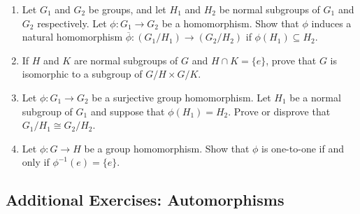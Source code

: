 {\begin{enumerate}
 
% 
%
% 

 
\item
Let $G_1$ and $G_2$ be groups, and let $H_1$ and $H_2$ be normal subgroups
of $G_1$ and $G_2$ respectively. Let $\phi : G_1 \rightarrow G_2$ be a
homomorphism. Show that $\phi$ induces a natural homomorphism
$\overline{\phi} : (G_1/H_1) \rightarrow (G_2/H_2)$ if $\phi(H_1) \subseteq
H_2$. 
 
 
\item
If $H$ and $K$ are normal subgroups of $G$ and $H \cap K = \{ e \}$,
prove that $G$ is isomorphic to a subgroup of $G/H \times G/K$.
 
 
 
\item
Let $\phi : G_1 \rightarrow G_2$ be a surjective group homomorphism.
Let $H_1$ be a normal subgroup of $G_1$ and suppose that $\phi(H_1) =
H_2$.  Prove or disprove that $G_1/H_1 \cong G_2/H_2$.
 
 
\item
Let $\phi : G \rightarrow H$ be a group homomorphism.  Show that
$\phi$ is one-to-one if and only if $\phi^{-1}(e) = \{ e \}$.


\end{enumerate}
}
 


\subsection*{Additional Exercises: Automorphisms}
 
